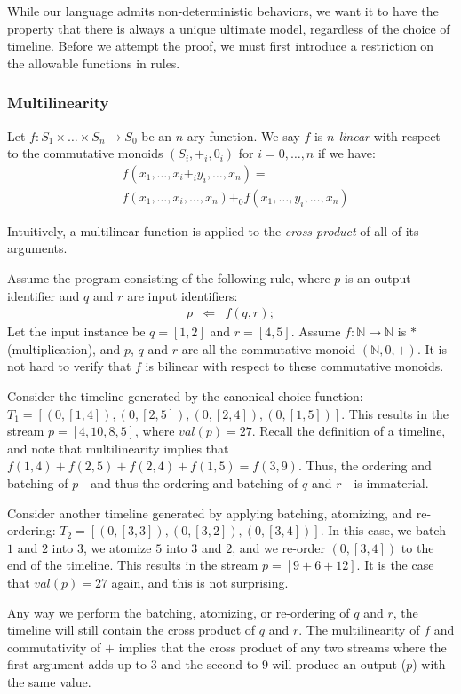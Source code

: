 While our language admits non-deterministic behaviors, we want it to have the property that there is always a unique ultimate model, regardless of the choice of timeline.  Before we attempt the proof, we must first introduce a restriction on the allowable functions in rules.


\subsubsection{Multilinearity}

Let $f : S_1 \times \ldots \times S_n \rightarrow S_0$ be an $n$-ary function.  We say $f$ is {\em $n$-linear} with respect to the commutative monoids $(S_i, +_i, 0_i)$ for $i = 0, \ldots, n$ if we have:
\begin{eqnarray*}
& f(x_1, \ldots, x_i +_i y_i, \ldots, x_n) = \\
& f(x_1, \ldots, x_i, \ldots, x_n) +_0 f(x_1, \ldots, y_i, \ldots, x_n)
\end{eqnarray*}

Intuitively, a multilinear function is applied to the {\em cross product} of all of its arguments.

\begin{example}
Assume the program consisting of the following rule, where $p$ is an output identifier and $q$ and $r$ are input identifiers:
\begin{eqnarray*}
  p &\Leftarrow& f(q, r);
\end{eqnarray*}
Let the input instance be $q = [1,2]$ and $r = [4,5]$.  Assume $f : \mathbb{N} \rightarrow \mathbb{N}$ is $*$ (multiplication), and $p$, $q$ and $r$ are all the commutative monoid $(\mathbb{N}, 0, +)$.  It is not hard to verify that $f$ is bilinear with respect to these commutative monoids.

Consider the timeline generated by the canonical choice function: $T_1 = [(0,[1,4]), (0,[2,5]), (0,[2,4]), (0,[1,5])]$.  This results in the stream $p = [4, 10, 8, 5]$, where $val(p) = 27$.  Recall the definition of a timeline, and note that multilinearity implies that $f(1,4) + f(2,5) + f(2,4) + f(1,5) = f(3,9)$.  Thus, the ordering and batching of $p$---and thus the ordering and batching of $q$ and $r$---is immaterial.

Consider another timeline generated by applying  batching, atomizing, and re-ordering: $T_2 = [(0,[3,3]), (0,[3,2]), (0,[3,4])]$.  In this case, we batch $1$ and $2$ into $3$, we atomize $5$ into $3$ and $2$, and we re-order $(0,[3,4])$ to the end of the timeline.  This results in the stream $p = [9 + 6 + 12]$.  It is the case that $val(p) = 27$ again, and this is not surprising.

Any way we perform the batching, atomizing, or re-ordering of $q$ and $r$, the timeline will still contain the cross product of $q$ and $r$.  The multilinearity of $f$ and commutativity of $+$ implies that the cross product of any two streams where the first argument adds up to $3$ and the second to $9$ will produce an output ($p$) with the same value.
\end{example}


